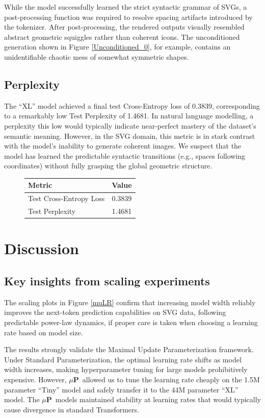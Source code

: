 \documentclass[11pt]{article}
\newcommand{\mup}{$\mu$\textbf{P}}
\begin{document}
While the model successfully learned the strict syntactic grammar of SVGs, a post-processing function
was required to resolve spacing artifacts introduced by the tokenizer. After post-processing, the rendered
outputs visually resembled abstract geometric squiggles rather than coherent icons.
The unconditioned generation shown in Figure \ref{Unconditioned_0}, for example,
contains an unidentifiable chaotic mess of somewhat symmetric shapes.

\subsection{Perplexity}

The ``XL'' model achieved a final test Cross-Entropy loss of 0.3839, corresponding to a remarkably low Test Perplexity of 1.4681.
In natural language modelling, a perplexity this low would typically indicate near-perfect mastery of the dataset's semantic meaning.
However, in the SVG domain, this metric is in stark contrast with the model's inability to generate coherent images.
We suspect that the model has learned the predictable syntactic transitions (e.g., spaces following coordinates)
without fully grasping the global geometric structure.

\begin{figure}[htbp]
	\centering
	\begin{tabular}{lc}
		Metric                  & Value  \\
		\hline
		Test Cross-Entropy Loss & 0.3839 \\
		Test Perplexity         & 1.4681
	\end{tabular}
	\label{Perplexity}
\end{figure}


\section{Discussion}

\subsection{Key insights from scaling experiments}

The scaling plots in Figure \ref{muLR} confirm that increasing model width reliably improves the next-token
prediction capabilities on SVG data, following predictable power-law dynamics, if proper care is taken when
choosing a learning rate based on model size.

The results strongly validate the Maximal Update Parameterization framework. Under Standard
Parameterization, the optimal learning rate shifts as model width increases, making
hyperparameter tuning for large models prohibitively expensive. However, \mup~allowed us to
tune the learning rate cheaply on the 1.5M parameter ``Tiny'' model and safely transfer it to the
44M parameter ``XL'' model. The \mup~models maintained stability at learning rates that would
typically cause divergence in standard Transformers.
\end{document}
